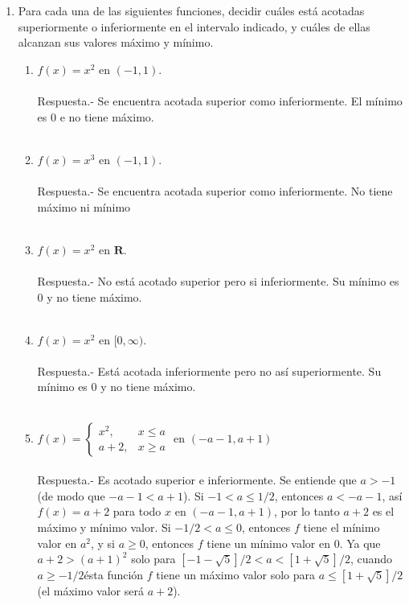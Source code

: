 \begin{enumerate}

\item Para cada una de las siguientes funciones, decidir cuáles está acotadas superiormente o inferiormente en el intervalo indicado, y cuáles de ellas alcanzan sus valores máximo y mínimo.

    \begin{enumerate}[\bfseries (i)]

	\item $f(x) = x^2$ en $(-1,1)$.\\\\
	    Respuesta.-\; Se encuentra acotada superior como inferiormente. El mínimo es $0$ e no tiene máximo.\\\\

	\item $f(x) = x^3$ en  $(-1,1)$.\\\\
	    Respuesta.-\; Se encuentra acotada superior como inferiormente. No tiene máximo ni mínimo\\\\

	\item $f(x) = x^2$ en $\mathbf{R}$.\\\\
	    Respuesta.-\; No está acotado superior pero si inferiormente. Su mínimo es $0$ y no tiene  máximo.\\\\ 

	\item $f(x)=x^2$ en $[0,\infty)$.\\\\
	    Respuesta.-\; Está acotada inferiormente pero no así superiormente. Su mínimo es $0$ y no tiene máximo.\\\\ 

	\item $f(x) = \left\{\begin{array}{ll} x^2, & x\leq a \\ a+2, & x\geq a \end{array}\right.$ en $(-a-1,a+1)$\\\\
	    Respuesta.-\; Es acotado superior e inferiormente. Se entiende que $a>-1$ (de modo que $-a-1<a+1$). Si $-1<a\leq 1/2$, entonces $a<-a-1$, así $f(x)=a+2$ para todo $x$ en $(-a-1,a+1)$, por lo tanto $a+2$ es el máximo y mínimo valor. Si $-1/2<a\leq 0$, entonces $f$ tiene el mínimo valor en $a^2$, y si $a\geq 0$, entonces $f$ tiene un mínimo valor en $0$. Ya que $a+2>(a+1)^2$ solo para $[-1-\sqrt{5}]/2 < a < [1+\sqrt{5}]/2$, cuando $a\geq -1/2$ésta función $f$ tiene un máximo valor solo para $a\leq [1+\sqrt{5}]/2$ (el máximo valor será $a+2$).\\\\


\end{enumerate}
\end{enumerate}
